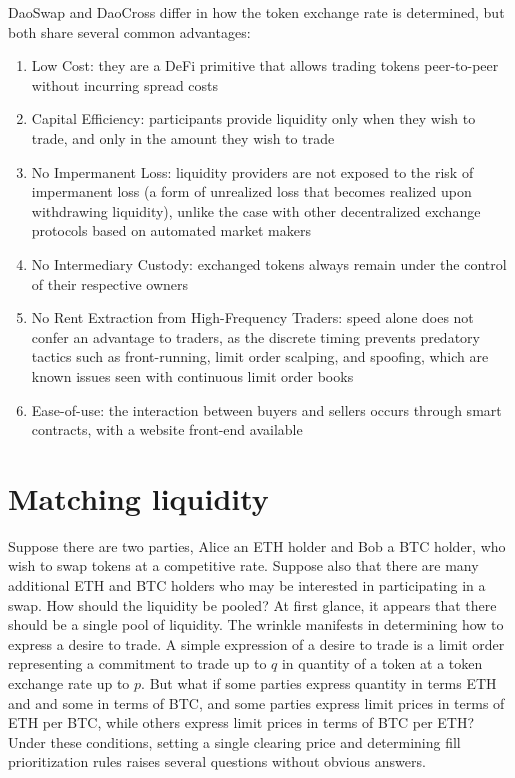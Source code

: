 \documentclass[11pt, reqno]{amsart}
\begin{document}
DaoSwap and DaoCross differ in how the token exchange rate is determined, but
both share several common advantages:
\begin{enumerate}
	\item Low Cost:
	      they are a DeFi primitive that allows trading tokens peer-to-peer
	      without incurring spread costs
	\item Capital Efficiency:
	      participants provide liquidity only when
	      they wish to trade, and only in the amount they wish to trade
	\item No Impermanent Loss:
	      liquidity providers are not exposed to the risk of impermanent loss
	      (a form of unrealized loss that becomes realized upon withdrawing
	      liquidity), unlike the case with other decentralized exchange protocols
	      based on automated market makers
	\item No Intermediary Custody:
	      exchanged tokens always remain under the control of their respective
	      owners
	\item No Rent Extraction from High-Frequency Traders:
	      speed alone does not confer an advantage to traders, as the discrete
	      timing prevents predatory tactics such as front-running, limit order
	      scalping, and spoofing, which are known issues seen with continuous
	      limit order books
	\item Ease-of-use: the interaction between buyers and sellers occurs
	      through smart contracts, with a website front-end available
\end{enumerate}


\section{Matching liquidity}
Suppose there are two parties, Alice an ETH holder and Bob a BTC holder, who
wish to swap tokens at a competitive rate. Suppose also that there are many
additional ETH and BTC holders who may be interested in participating in a
swap. How should the liquidity be pooled? At first glance, it appears that
there should be a single pool of liquidity. The wrinkle manifests in determining
how to express a desire to trade. A simple expression of a desire to trade is
a limit order representing a commitment to trade up to $q$ in quantity of
a token at a token exchange rate up to $p$. But what if some parties express
quantity in terms ETH and and some in terms of BTC, and some parties express
limit prices in terms of ETH per BTC, while others express limit prices in
terms of BTC per ETH? Under these conditions, setting a single clearing price
and determining fill prioritization rules raises several questions without
obvious answers.
\end{document}
